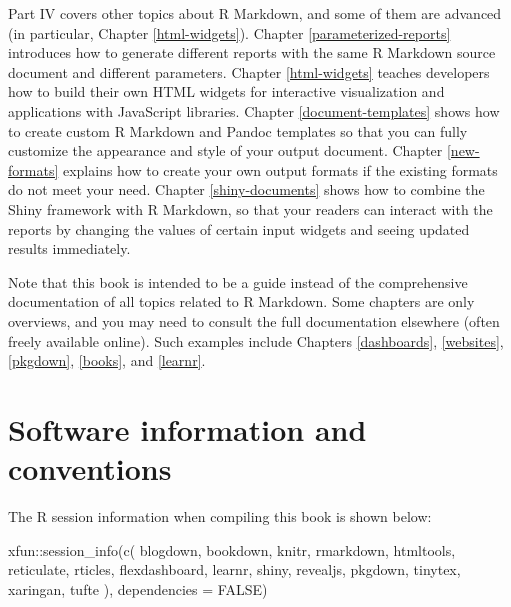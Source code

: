 \documentclass[
  11pt,
]{krantz}
\makeatletter
\newenvironment{Shaded}{\begin{snugshade}}{\end{snugshade}}
\newcommand{\AttributeTok}[1]{\textcolor[rgb]{0.61,0.61,0.61}{#1}}
\newcommand{\ConstantTok}[1]{\textcolor[rgb]{0,0,0}{#1}}
\newcommand{\FunctionTok}[1]{\textcolor[rgb]{0,0,0}{#1}}
\newcommand{\NormalTok}[1]{#1}
\newcommand{\SpecialCharTok}[1]{\textcolor[rgb]{0,0,0}{#1}}
\newcommand{\StringTok}[1]{\textcolor[rgb]{0.5,0.5,0.5}{#1}}
\newenvironment{kframe}{%
\medskip{}
\setlength{\fboxsep}{.8em}
 \def\at@end@of@kframe{}%
 \ifinner\ifhmode%
  \def\at@end@of@kframe{\end{minipage}}%
  \begin{minipage}{\columnwidth}%
 \fi\fi%
 \def\FrameCommand##1{\hskip\@totalleftmargin \hskip-\fboxsep
 \colorbox{shadecolor}{##1}\hskip-\fboxsep
     \hskip-\linewidth \hskip-\@totalleftmargin \hskip\columnwidth}%
 \MakeFramed {\advance\hsize-\width
   \@totalleftmargin\z@ \linewidth\hsize
   \@setminipage}}%
 {\par\unskip\endMakeFramed%
 \at@end@of@kframe}
\renewenvironment{Shaded}{\begin{kframe}}{\end{kframe}}
\theoremstyle{definition}
\theoremstyle{definition}
\theoremstyle{definition}
\theoremstyle{definition}
\theoremstyle{remark}
\makeatother
\begin{document}
Part IV covers other topics about R Markdown, and some of them are advanced (in particular, Chapter \ref{html-widgets}). Chapter \ref{parameterized-reports} introduces how to generate different reports with the same R Markdown source document and different parameters. Chapter \ref{html-widgets} teaches developers how to build their own HTML widgets for interactive visualization and applications with JavaScript libraries. Chapter \ref{document-templates} shows how to create custom R Markdown and Pandoc templates so that you can fully customize the appearance and style of your output document. Chapter \ref{new-formats} explains how to create your own output formats if the existing formats do not meet your need. Chapter \ref{shiny-documents} shows how to combine the Shiny framework with R Markdown, so that your readers can interact with the reports by changing the values of certain input widgets and seeing updated results immediately.

Note that this book is intended to be a guide instead of the comprehensive documentation of all topics related to R Markdown. Some chapters are only overviews, and you may need to consult the full documentation elsewhere (often freely available online). Such examples include Chapters \ref{dashboards}, \ref{websites}, \ref{pkgdown}, \ref{books}, and \ref{learnr}.

\hypertarget{software-info}{%
\section*{Software information and conventions}\label{software-info}}


The R session information when compiling this book is shown below:

\begin{Shaded}
\begin{Highlighting}[]
\NormalTok{xfun}\SpecialCharTok{::}\FunctionTok{session\_info}\NormalTok{(}\FunctionTok{c}\NormalTok{(}
  \StringTok{\textquotesingle{}blogdown\textquotesingle{}}\NormalTok{, }\StringTok{\textquotesingle{}bookdown\textquotesingle{}}\NormalTok{, }\StringTok{\textquotesingle{}knitr\textquotesingle{}}\NormalTok{, }\StringTok{\textquotesingle{}rmarkdown\textquotesingle{}}\NormalTok{, }\StringTok{\textquotesingle{}htmltools\textquotesingle{}}\NormalTok{,}
  \StringTok{\textquotesingle{}reticulate\textquotesingle{}}\NormalTok{, }\StringTok{\textquotesingle{}rticles\textquotesingle{}}\NormalTok{, }\StringTok{\textquotesingle{}flexdashboard\textquotesingle{}}\NormalTok{, }\StringTok{\textquotesingle{}learnr\textquotesingle{}}\NormalTok{, }\StringTok{\textquotesingle{}shiny\textquotesingle{}}\NormalTok{,}
  \StringTok{\textquotesingle{}revealjs\textquotesingle{}}\NormalTok{, }\StringTok{\textquotesingle{}pkgdown\textquotesingle{}}\NormalTok{, }\StringTok{\textquotesingle{}tinytex\textquotesingle{}}\NormalTok{, }\StringTok{\textquotesingle{}xaringan\textquotesingle{}}\NormalTok{, }\StringTok{\textquotesingle{}tufte\textquotesingle{}}
\NormalTok{), }\AttributeTok{dependencies =} \ConstantTok{FALSE}\NormalTok{)}
\end{Highlighting}
\end{Shaded}
\end{document}
